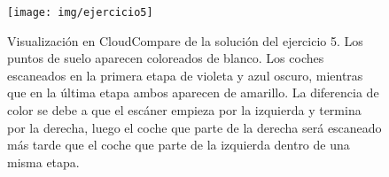 \documentclass[]{article}
\begin{document}
	\begin{figure}[htb]
		\centering
		\texttt{[image: img/ejercicio5]}
		\caption{Visualización en CloudCompare de la solución del ejercicio 5. Los puntos de suelo aparecen coloreados de blanco. Los coches escaneados en la primera etapa de violeta y azul oscuro, mientras que en la última etapa ambos aparecen de amarillo. La diferencia de color se debe a que el escáner empieza por la izquierda y termina por la derecha, luego el coche que parte de la derecha será escaneado más tarde que el coche que parte de la izquierda dentro de una misma etapa.}
		\label{fig:ejercicio5}
	\end{figure} 


	
\end{document}
